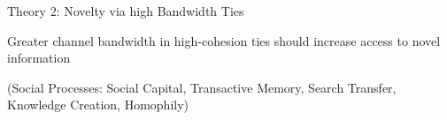 \begin{frame}{{\color{violet}Theory 2: {\color{salmon}Novelty} via high {\color{blue}Bandwidth} Ties}}

  \begin{center}
    Greater channel {\color{blue}bandwidth} in high-cohesion ties should increase access to {\color{salmon}novel} information
  \end{center}

  \vspace{2ex}
  \begin{center}
    \scriptsize (Social Processes: Social Capital, Transactive Memory, Search Transfer, Knowledge Creation, Homophily)
  \end{center}



\end{frame}

